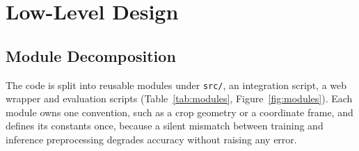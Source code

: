 \chapter{Low-Level Design}
\label{ch:lld}

\section{Module Decomposition}

The code is split into reusable modules under \texttt{src/}, an integration script, a web wrapper and
evaluation scripts (Table~\ref{tab:modules}, Figure~\ref{fig:modules}). Each module owns one
convention, such as a crop geometry or a coordinate frame, and defines its constants once, because a
silent mismatch between training and inference preprocessing degrades accuracy without raising any
error.

